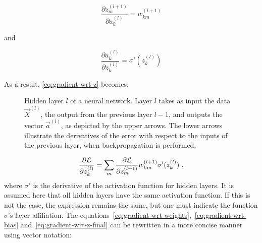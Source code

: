 \begin{equation*}
\frac{\partial z_{m}^{(l+1)}}{\partial a_{k}^{(l)}} = w_{km}^{(l+1)}
\end{equation*}

and

\begin{equation*}
\frac{\partial a_{k}^{(l)}}{\partial z_{k}^{(l)}} = \sigma'(z_{k}^{(l)})
\end{equation*}

As a result, \eqref{eq:gradient-wrt-z} becomes:

\begin{figure}
    \centering
    \caption{Hidden layer $l$ of a neural network. Layer $l$ takes as input the data $\Vec{X}^{(l)}$, the output from the previous layer $l-1$, and outputs the vector $\Vec{a}^{(l)}$, as depicted by the upper arrows. The lower arrows illustrate the derivatives of the error with respect to the inputs of the previous layer, when backpropagation is performed.}
    \label{fig:illustration-layer-l}
\end{figure}

\begin{equation}
\label{eq:gradient-wrt-z-final}
\frac{\partial \mathcal{L}}{\partial z_{k}^{(l)}} = \sum_{m} \frac{\partial \mathcal{L}}{\partial z_{m}^{(l+1)}}w_{km}^{(l+1)}\sigma'(z_{k}^{(l)}) \text{ ,}
\end{equation}
where $\sigma'$ is the derivative of the activation function for hidden layers. It is assumed here that all hidden layers have the same activation function. If this is not the case, the expression remains the same, but one must indicate the function $\sigma$'s layer affiliation. The equations~\eqref{eq:gradient-wrt-weights},~\eqref{eq:gradient-wrt-bias} and~\eqref{eq:gradient-wrt-z-final} can be rewritten in a more concise manner using vector notation:

